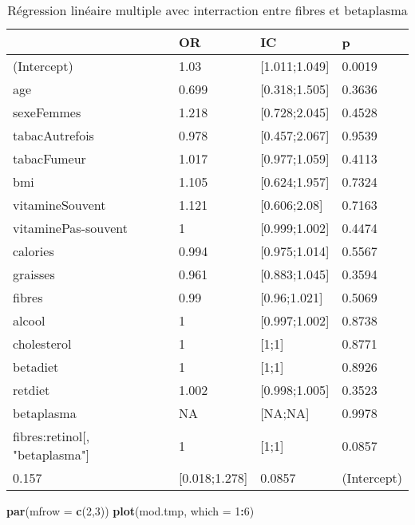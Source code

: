 \documentclass[]{article}
\newenvironment{Shaded}{\begin{snugshade}}{\end{snugshade}}
\newcommand{\KeywordTok}[1]{\textcolor[rgb]{0.13,0.29,0.53}{\textbf{#1}}}
\newcommand{\DataTypeTok}[1]{\textcolor[rgb]{0.13,0.29,0.53}{#1}}
\newcommand{\DecValTok}[1]{\textcolor[rgb]{0.00,0.00,0.81}{#1}}
\newcommand{\OperatorTok}[1]{\textcolor[rgb]{0.81,0.36,0.00}{\textbf{#1}}}
\newcommand{\NormalTok}[1]{#1}
\begin{document}
\begin{table}

\caption{\label{tab:unnamed-chunk-90}Régression linéaire multiple avec interraction entre fibres et betaplasma}
\centering
\begin{tabular}[t]{l|l|l|l}
\hline
  & OR & IC & p\\
\hline
\rowcolor[HTML]{BBD2E1}  (Intercept) & 1.03 & [1.011;1.049] & 0.0019\\
\hline
age & 0.699 & [0.318;1.505] & 0.3636\\
\hline
\rowcolor[HTML]{BBD2E1}  sexeFemmes & 1.218 & [0.728;2.045] & 0.4528\\
\hline
tabacAutrefois & 0.978 & [0.457;2.067] & 0.9539\\
\hline
\rowcolor[HTML]{BBD2E1}  tabacFumeur & 1.017 & [0.977;1.059] & 0.4113\\
\hline
bmi & 1.105 & [0.624;1.957] & 0.7324\\
\hline
\rowcolor[HTML]{BBD2E1}  vitamineSouvent & 1.121 & [0.606;2.08] & 0.7163\\
\hline
vitaminePas-souvent & 1 & [0.999;1.002] & 0.4474\\
\hline
\rowcolor[HTML]{BBD2E1}  calories & 0.994 & [0.975;1.014] & 0.5567\\
\hline
graisses & 0.961 & [0.883;1.045] & 0.3594\\
\hline
\rowcolor[HTML]{BBD2E1}  fibres & 0.99 & [0.96;1.021] & 0.5069\\
\hline
alcool & 1 & [0.997;1.002] & 0.8738\\
\hline
\rowcolor[HTML]{BBD2E1}  cholesterol & 1 & [1;1] & 0.8771\\
\hline
betadiet & 1 & [1;1] & 0.8926\\
\hline
\rowcolor[HTML]{BBD2E1}  retdiet & 1.002 & [0.998;1.005] & 0.3523\\
\hline
betaplasma & NA & [NA;NA] & 0.9978\\
\hline
\rowcolor[HTML]{BBD2E1}  fibres:retinol[, "betaplasma"] & 1 & [1;1] & 0.0857\\
\hline
0.157 & [0.018;1.278] & 0.0857 & (Intercept)\\
\hline
\end{tabular}
\end{table}

\begin{Shaded}
\begin{Highlighting}[]
\KeywordTok{par}\NormalTok{(}\DataTypeTok{mfrow =} \KeywordTok{c}\NormalTok{(}\DecValTok{2}\NormalTok{,}\DecValTok{3}\NormalTok{))}
\KeywordTok{plot}\NormalTok{(mod.tmp, }\DataTypeTok{which =} \DecValTok{1}\OperatorTok{:}\DecValTok{6}\NormalTok{)}
\end{Highlighting}
\end{Shaded}
\end{document}
